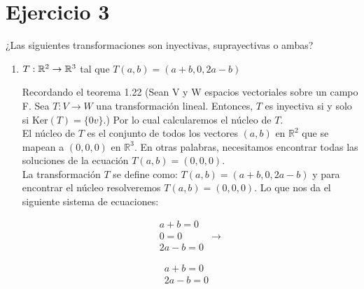 \section*{Ejercicio 3}

¿Las siguientes transformaciones son inyectivas, suprayectivas o ambas?








\begin{enumerate}
    \item $T: \mathbb{R}^{2} \rightarrow \mathbb{R}^{3}$ tal que $T(a,b) = (a + b, 0, 2a - b)$

      Recordando el teorema 1.22 (Sean V y W espacios vectoriales sobre un campo F. Sea \(T:V \to W\) una transformación
       lineal. Entonces, \(T\) es inyectiva si y solo si \(\text{Ker}(T)=\{0v\}\).) Por lo cual calcularemos el núcleo
       de \(T\).\\

      El núcleo de \(T\) es el conjunto de todos los vectores \((a, b)\) en \(\mathbb{R}^2\) que se mapean a
       \((0, 0, 0)\) en \(\mathbb{R}^3\). En otras palabras, necesitamos encontrar todas las soluciones de la ecuación
       \(T(a,b) = (0, 0, 0)\). \\
       
      La transformación \(T\) se define como: \(T(a,b) = (a+b, 0, 2a-b)\) y para encontrar el
       núcleo resolveremos \(T(a,b) = (0, 0, 0)\). Lo que nos da el siguiente sistema de ecuaciones:
      \begin{center}      
      \begin{minipage}{2cm}
            \begin{align*}
                  a + b = 0 & \\
                  0 = 0 & \rightarrow \\
                  2a - b = 0 &
            \end{align*}
      \end{minipage}
      \begin{minipage}{3cm}
            \begin{align*}
                  a + b = 0 &  \\                  
                  2a - b = 0 &
            \end{align*}
      \end{minipage}
      \end{center}


\end{enumerate}
